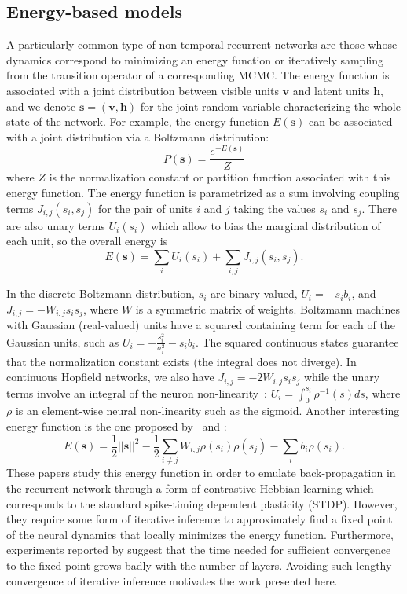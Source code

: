 \documentclass{article}
\newcommand   \vv{{\bm v}}
\newcommand   \vh{{\bm h}}
\newcommand   \vs{{\bm s}}
\begin{document}
\subsection{Energy-based models}

A particularly common type of non-temporal recurrent networks are those
whose dynamics correspond to minimizing an energy function or iteratively sampling
from the transition operator of a corresponding MCMC.
The energy function is associated with a joint distribution between visible units $\vv$
and latent units $\vh$, and we denote $\vs=(\vv,\vh)$ for
the joint random variable characterizing the whole state of the network.
For example, the energy function $E(\vs)$ can be associated with a joint distribution
via a Boltzmann distribution:
\begin{equation}
  P(\vs) = \frac{e^{-E(\vs)}}{Z}
\end{equation}
where $Z$ is the normalization constant or partition function associated with this
energy function. The energy function is parametrized as a sum involving coupling terms
$J_{i,j}(s_i,s_j)$ for the pair of units $i$ and $j$ taking the values $s_i$ and $s_j$.
There are also unary terms $U_i(s_i)$ which allow to bias the marginal distribution
of each unit, so the overall energy is
\begin{equation}
  E(\vs) = \sum_i U_i(s_i) + \sum_{i,j} J_{i,j}(s_i,s_j).
\end{equation}

In the discrete Boltzmann distribution, $s_i$ are binary-valued, $U_i = -s_i b_i$,
and $J_{i,j} = - W_{i,j} s_i s_j$, where $W$ is a symmetric matrix of weights.
Boltzmann machines with Gaussian (real-valued) units have a squared containing term for
each of the Gaussian units, such as $U_i = -\frac{s_i^2}{\sigma_i^2} - s_i b_i$.
The squared continuous states guarantee that the normalization constant exists (the integral does not diverge).
In continuous Hopfield networks, we also have $J_{i,j}=- 2 W_{i,j} s_i s_j$ while
the unary terms involve an integral of the neuron non-linearity~\citep{Hopfield84}:
$U_i = \int_0^{s_i} \rho^{-1}(s) ds$, where $\rho$ is an element-wise neural non-linearity
such as the sigmoid. Another interesting energy function is the one proposed
by~\citet{Bengio-arxiv2015} and \citet{Scellier+Bengio-arxiv2016}:
\begin{equation}
  \label{eq:s+b-energy}
  E(\vs) = \frac{1}{2}||\vs||^2 - \frac{1}{2}\sum_{i\neq j} W_{i,j} \rho(s_i) \rho(s_j) - \sum_i b_i \rho(s_i).
\end{equation}
These papers study this energy function in order to emulate back-propagation
in the recurrent network through a form of contrastive Hebbian learning which
corresponds to the standard spike-timing dependent plasticity (STDP).
However, they require some form of iterative inference
to approximately find a fixed point of
the neural dynamics that locally minimizes the energy function.
Furthermore, experiments reported by \citet{Scellier+Bengio-arxiv2016} suggest that the time needed for sufficient
convergence to the fixed point grows badly with the number of layers. Avoiding
such lengthy convergence of iterative inference motivates the work presented here.
\end{document}

